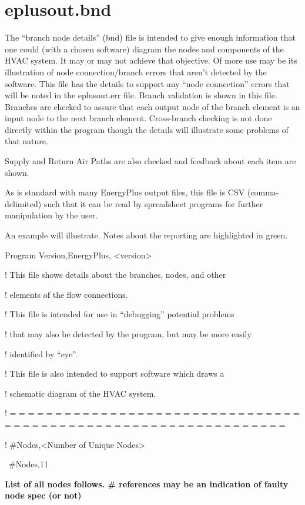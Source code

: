 \section{eplusout.bnd}\label{eplusout.bnd}

The ``branch node details'' (bnd) file is intended to give enough information that one could (with a chosen software) diagram the nodes and components of the HVAC system. It may or may not achieve that objective. Of more use may be its illustration of node connection/branch errors that aren't detected by the software. This file has the details to support any ``node connection'' errors that will be noted in the eplusout.err file. Branch validation is shown in this file. Branches are checked to assure that each output node of the branch element is an input node to the next branch element. Cross-branch checking is not done directly within the program though the details will illustrate some problems of that nature.

Supply and Return Air Paths are also checked and feedback about each item are shown.

As is standard with many EnergyPlus output files, this file is CSV (comma-delimited) such that it can be read by spreadsheet programs for further manipulation by the user.

An example will illustrate. Notes about the reporting are highlighted in green.

Program Version,EnergyPlus, \textless{}version\textgreater{}

! This file shows details about the branches, nodes, and other

! elements of the flow connections.

! This file is intended for use in ``debugging'' potential problems

! that may also be detected by the program, but may be more easily

! identified by ``eye''.

! This file is also intended to support software which draws a

! schematic diagram of the HVAC system.

! = = = = = = = = = = = = = = = = = = = = = = = = = = = = = = = = = = = = = = = = = = = = = = = = = = = = = = = = = = = = = = =

! \#Nodes,\textless{}Number of Unique Nodes\textgreater{}

~\#Nodes,11

\textbf{List of all nodes follows. \# references may be an indication of faulty node spec (or not)}

